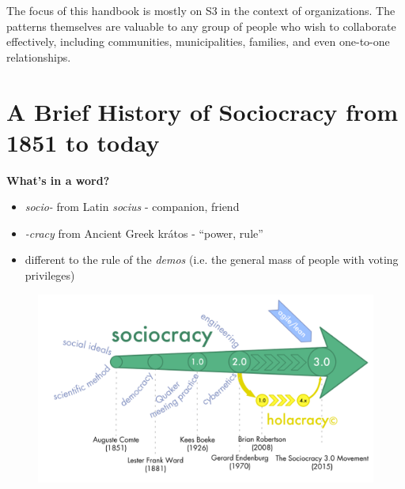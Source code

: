 The focus of this handbook is mostly on S3 in the context of organizations. The patterns themselves are valuable to any group of people who wish to collaborate effectively, including communities, municipalities, families, and even one-to-one relationships.

\chapter{A Brief History of Sociocracy from 1851 to today}
\label{abriefhistoryofsociocracyfrom1851totoday}

\textbf{What’s in a word?}

\begin{itemize}
\item \emph{socio-} from Latin \emph{socius} - companion, friend

\item \emph{-cracy} from Ancient Greek krátos - “power, rule”

\item different to the rule of the \emph{demos} (i.e. the general mass of people with voting privileges)

\end{itemize}

\begin{figure}[htbp]
\centering
\includegraphics[keepaspectratio,width=\textwidth,height=0.75\textheight]{img/general/history.png}
\end{figure}

